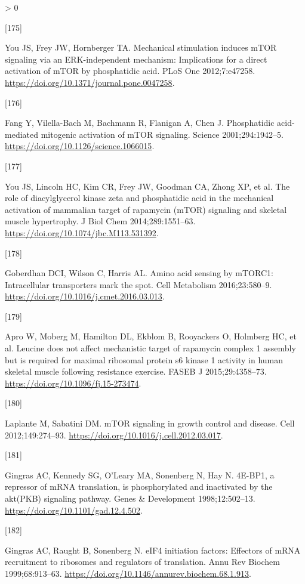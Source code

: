 \documentclass[twoside,10pt]{gihclass} %
\newlength{\cslhangindent}
\newlength{\csllabelwidth}
\newenvironment{CSLReferences}[3] %
 {%
  \setlength{\parindent}{0pt}
  \ifodd #1 \everypar{\setlength{\hangindent}{\cslhangindent}}\ignorespaces\fi
  \ifnum #2 > 0
  \setlength{\parskip}{#2\baselineskip}
  \fi
 }%
 {}
\newcommand{\CSLLeftMargin}[1]{\parbox[t]{\maxof{\widthof{#1}}{\csllabelwidth}}{#1}}
\newcommand{\CSLRightInline}[1]{\parbox[t]{\linewidth}{#1}}
\begin{document}
\begin{CSLReferences}{0}{0}
\leavevmode\hypertarget{ref-RN2119}{}%
\CSLLeftMargin{{[}175{]} }
\CSLRightInline{You JS, Frey JW, Hornberger TA. Mechanical stimulation induces mTOR signaling via an ERK-independent mechanism: Implications for a direct activation of mTOR by phosphatidic acid. PLoS One 2012;7:e47258. \url{https://doi.org/10.1371/journal.pone.0047258}.}

\leavevmode\hypertarget{ref-RN2126}{}%
\CSLLeftMargin{{[}176{]} }
\CSLRightInline{Fang Y, Vilella-Bach M, Bachmann R, Flanigan A, Chen J. Phosphatidic acid-mediated mitogenic activation of mTOR signaling. Science 2001;294:1942--5. \url{https://doi.org/10.1126/science.1066015}.}

\leavevmode\hypertarget{ref-RN1728}{}%
\CSLLeftMargin{{[}177{]} }
\CSLRightInline{You JS, Lincoln HC, Kim CR, Frey JW, Goodman CA, Zhong XP, et al. The role of diacylglycerol kinase zeta and phosphatidic acid in the mechanical activation of mammalian target of rapamycin (mTOR) signaling and skeletal muscle hypertrophy. J Biol Chem 2014;289:1551--63. \url{https://doi.org/10.1074/jbc.M113.531392}.}

\leavevmode\hypertarget{ref-RN2848}{}%
\CSLLeftMargin{{[}178{]} }
\CSLRightInline{Goberdhan DCI, Wilson C, Harris AL. Amino acid sensing by mTORC1: Intracellular transporters mark the spot. Cell Metabolism 2016;23:580--9. \url{https://doi.org/10.1016/j.cmet.2016.03.013}.}

\leavevmode\hypertarget{ref-RN1641}{}%
\CSLLeftMargin{{[}179{]} }
\CSLRightInline{Apro W, Moberg M, Hamilton DL, Ekblom B, Rooyackers O, Holmberg HC, et al. Leucine does not affect mechanistic target of rapamycin complex 1 assembly but is required for maximal ribosomal protein s6 kinase 1 activity in human skeletal muscle following resistance exercise. FASEB J 2015;29:4358--73. \url{https://doi.org/10.1096/fj.15-273474}.}

\leavevmode\hypertarget{ref-RN2139}{}%
\CSLLeftMargin{{[}180{]} }
\CSLRightInline{Laplante M, Sabatini DM. mTOR signaling in growth control and disease. Cell 2012;149:274--93. \url{https://doi.org/10.1016/j.cell.2012.03.017}.}

\leavevmode\hypertarget{ref-RN2837}{}%
\CSLLeftMargin{{[}181{]} }
\CSLRightInline{Gingras AC, Kennedy SG, O'Leary MA, Sonenberg N, Hay N. 4E-BP1, a repressor of mRNA translation, is phosphorylated and inactivated by the akt(PKB) signaling pathway. Genes \& Development 1998;12:502--13. \url{https://doi.org/10.1101/gad.12.4.502}.}

\leavevmode\hypertarget{ref-RN2838}{}%
\CSLLeftMargin{{[}182{]} }
\CSLRightInline{Gingras AC, Raught B, Sonenberg N. eIF4 initiation factors: Effectors of mRNA recruitment to ribosomes and regulators of translation. Annu Rev Biochem 1999;68:913--63. \url{https://doi.org/10.1146/annurev.biochem.68.1.913}.}


\end{CSLReferences}
\end{document}
